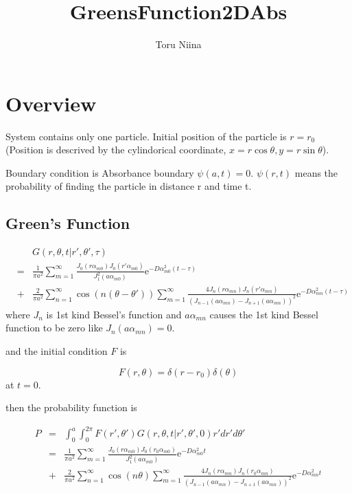 \documentclass{article}
\begin{document}
\title{GreensFunction2DAbs}
\author{Toru Niina}
\maketitle

\section{Overview}

System contains only one particle. Initial position of the particle is $r=r_0$
(Position is descrived by the cylindorical coordinate,
$x = r\cos\theta, y = r\sin\theta$).

Boundary condition is Absorbance boundary $\psi(a,t) = 0$.
$\psi(r, t)$ means the probability of finding the particle in distance r and time t.

\subsection{Green's Function}

\begin{eqnarray}
    & & G(r, \theta, t | r', \theta', \tau) \nonumber\\
    &=& \frac{1}{\pi a^2}\sum^{\infty}_{m=1}
        \frac{J_0(r\alpha_{m0})J_0(r'\alpha_{m0})}{J^2_1(a\alpha_{m0})}
        \mathrm{e}^{-D\alpha^2_{m0} (t-\tau)} \nonumber \\
    &+& \frac{2}{\pi a^2}\sum^{\infty}_{n=1}\cos(n(\theta - \theta'))
        \sum^{\infty}_{m=1}
        \frac{4J_n(r\alpha_{mn})J_n(r'\alpha_{mn})}
             {(J_{n-1}(a\alpha_{mn})-J_{n+1}(a\alpha_{mn}))^2}
        \mathrm{e}^{-D\alpha^2_{mn} (t-\tau)} \nonumber
\end{eqnarray}
where $J_n$ is 1st kind Bessel's function and
$a\alpha_{mn}$ causes the 1st kind Bessel function to be zero like
$J_n(a\alpha_{mn}) = 0$. 

and the initial condition $F$ is

\begin{equation}
    F(r, \theta) = \delta(r - r_0)\delta(\theta)
\end{equation}
at $t=0$.

then the probability function is

\begin{eqnarray}
    P &=& \int^a_0 \int^{2\pi}_0 F(r', \theta')
                                 G(r, \theta, t | r', \theta', 0)
                                 r'dr'd\theta' \nonumber \\
      &=& \frac{1}{\pi a^2}\sum^{\infty}_{m=1}
                                 \frac{J_0(r\alpha_{m0})J_0(r_0\alpha_{m0})}
                                      {J^2_1(a\alpha_{m0})}
          \mathrm{e}^{-D\alpha^2_{m0} t} \nonumber \\
      &+& \frac{2}{\pi a^2}\sum^{\infty}_{n=1}\cos(n\theta)
          \sum^{\infty}_{m=1}
          \frac{4J_n(r\alpha_{mn})J_n(r_0\alpha_{mn})}
               {(J_{n-1}(a\alpha_{mn})-J_{n+1}(a\alpha_{mn}))^2}
          \mathrm{e}^{-D\alpha^2_{mn} t}
\end{eqnarray}
\end{document}
